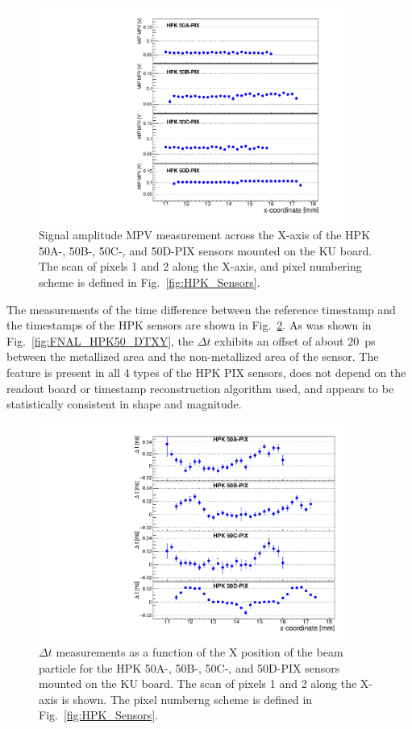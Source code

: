 \documentclass[preprint,1p]{elsarticle}
\begin{document}
\begin{figure}[htbp] 
\centering
\includegraphics[width=0.9\textwidth]{figs/KUBoard_HPK50ABCD/KUBoard_50ABCD_MPV.pdf} 
\caption{Signal amplitude MPV measurement across the X-axis of the HPK 50A-, 50B-, 50C-, and 50D-PIX sensors mounted on the KU board. The scan of pixels 1 and 2 along the X-axis, and pixel numbering scheme is defined in Fig.~\ref{fig:HPK_Sensors}.} 
\label{fig:KUBoard_50ABCD_MPV} 
\end{figure} 

The measurements of the time difference between the reference timestamp and the
timestamps of the HPK sensors are shown in
Fig.~\ref{fig:KUBoard_50ABCD_MeanTime}. As was shown in
Fig.~\ref{fig:FNAL_HPK50_DTXY}, the $\Delta t$ exhibits an offset of about
$20$~ps between the metallized area and the non-metallized area of the sensor. The
feature is present in all 4 types of the HPK PIX sensors, does not depend on the
readout board or timestamp reconstruction algorithm used, and appears to be
statistically consistent in shape and magnitude. 

\begin{figure}[htbp] 
\centering
\includegraphics[width=0.9\textwidth]{figs/KUBoard_HPK50ABCD/KUBoard_50ABCD_MeanTime.pdf} 
\caption{$\Delta t$ measurements as a function of the X position of the beam particle 
for the HPK 50A-, 50B-, 50C-, and 50D-PIX sensors mounted on the KU board. The scan 
of pixels 1 and 2 along the X-axis is shown. The pixel numberng scheme is defined 
in Fig.~\ref{fig:HPK_Sensors}.} 
\label{fig:KUBoard_50ABCD_MeanTime} 
\end{figure} 
\end{document}

